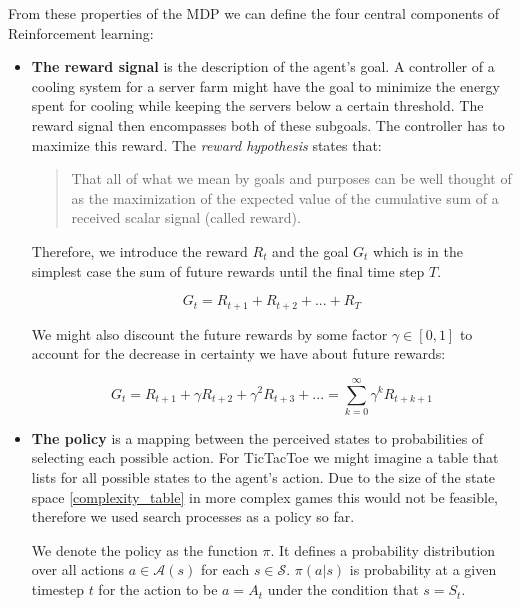From these properties of the MDP we can define the four central components of Reinforcement learning:

\begin{itemize}
    \item \textbf{The reward signal} is the description of the agent's goal. A controller of a cooling system for a server farm might have the goal to minimize the energy spent for cooling while keeping the servers below a certain threshold. The reward signal then encompasses both of these subgoals. The controller has to maximize this reward. The \textit{reward hypothesis} states that:
          \begin{quotation}
              That all of what we mean by goals and purposes can be well thought of as the maximization of the expected value of the cumulative sum of a received scalar signal (called reward). \cite[p. 52]{sutton_reinforcement_2018}
          \end{quotation}
          Therefore, we introduce the reward $R_t $ and the goal $ G_t $ which is in the simplest case the sum of future rewards until the final time step $T$.

          \begin{equation}
              G_t = R_{t+1} + R_{t+2} + ... + R_T
          \end{equation}

          We might also discount the future rewards by some factor $\gamma \in [0, 1] $ to account for the decrease in certainty we have about future rewards:

          \begin{equation}
              G_t = R_{t+1} + \gamma R_{t+2} + \gamma^2 R_{t+3} + ... = \sum_{k=0}^{\infty} \gamma^kR_{t+k+1}
          \end{equation}

    \item \textbf{The policy} is a mapping between the perceived states to probabilities of selecting each possible action. For TicTacToe we might imagine a table that lists for all possible states to the agent's action. Due to the size of the state space \ref{complexity_table} in more complex games this would not be feasible, therefore we used search processes as a policy so far.

          We denote the policy as the function $\pi $. It defines a probability distribution over all actions $ a \in \mathcal{A}(s)$ for each $ s \in \mathcal{S} $. $ \pi(a|s)$ is probability at a given timestep $t$ for the action to be $ a = A_t $ under the condition that $ s = S_t $.


\end{itemize}
